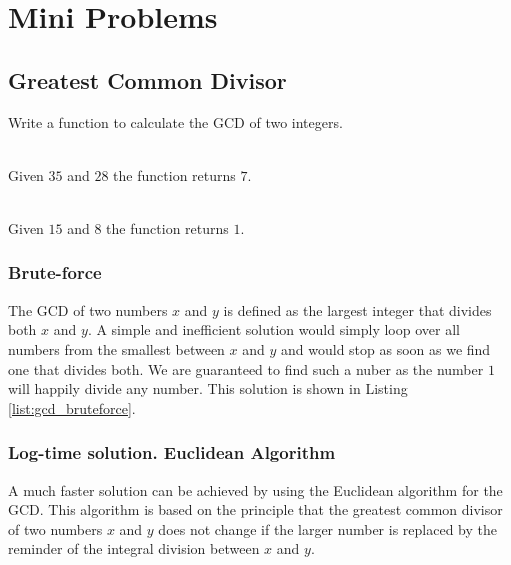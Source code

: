 \chapter{Mini Problems}

\section{Greatest Common Divisor}
\begin{exercise}
    Write a function to calculate the GCD of two integers.
    \begin{example}
        \label{ex:gcd:example1}
        \hfill \\
        Given $35$ and $28$ the function returns $7$.
    \end{example}
    
    \begin{example}
        \label{ex:gcd:example1}
        \hfill \\
        Given $15$ and $8$ the function returns $1$.
    \end{example}

    \end{exercise}

\subsection{\CC Brute-force}
The GCD of two numbers $x$ and $y$ is defined as the largest integer that divides both $x$ and $y$. A simple and inefficient solution would simply loop over all numbers from the smallest between $x$ and $y$ and would stop as soon as we find one that divides both. We are guaranteed to find such a nuber as the number $1$ will happily divide any number. This solution is shown in Listing \ref{list:gcd_bruteforce}.



\subsection{Log-time solution. Euclidean Algorithm}
A much faster solution can be achieved by using the Euclidean algorithm for the GCD.
This algorithm is based on the principle that the greatest common divisor of two numbers $x$ and $y$ does not change if the larger number is replaced by the reminder of the integral division between $x$ and $y$.

